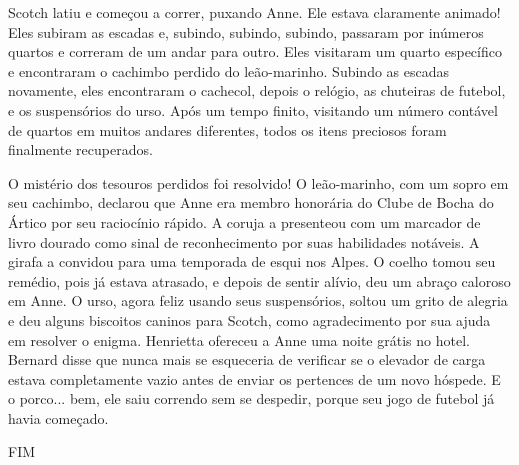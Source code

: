 Scotch latiu e começou a correr, puxando Anne. Ele estava claramente animado! Eles subiram as escadas e, subindo, subindo, subindo, passaram por inúmeros quartos e correram de um andar para outro. Eles visitaram um quarto específico e encontraram o cachimbo perdido do leão-marinho. Subindo as escadas novamente, eles encontraram o cachecol, depois o relógio, as chuteiras de futebol, e os suspensórios do urso. Após um tempo finito, visitando um número contável de quartos em muitos andares diferentes, todos os itens preciosos foram finalmente recuperados. 

\clearpage


O mistério dos tesouros perdidos foi resolvido! O leão-marinho, com um sopro em seu cachimbo, declarou que Anne era membro honorária do Clube de Bocha do Ártico por seu raciocínio rápido. A coruja a presenteou com um marcador de livro dourado como sinal de reconhecimento por suas habilidades notáveis. A girafa a convidou para uma temporada de esqui nos Alpes. O coelho tomou seu remédio, pois já estava atrasado, e depois de sentir alívio, deu um abraço caloroso em Anne. O urso, agora feliz usando seus suspensórios, soltou um grito de alegria e deu alguns biscoitos caninos para Scotch, como agradecimento por sua ajuda em resolver o enigma. Henrietta ofereceu a Anne uma noite grátis no hotel. Bernard disse que nunca mais se esqueceria de verificar se o elevador de carga estava completamente vazio antes de enviar os pertences de um novo hóspede. E o porco... bem, ele saiu correndo sem se despedir, porque seu jogo de futebol já havia começado.

\vfill
\begin{center}
\Huge
FIM
\end{center}
